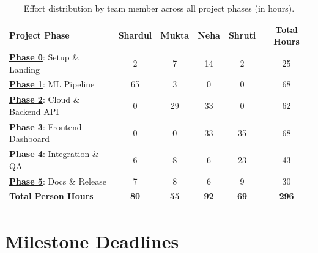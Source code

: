 \documentclass[11pt, a4paper]{article}
\newcommand{\goref}[2]{\hyperref[#1]{\textcolor{primary}{\textbf{#2}}}}
\begin{document}
\begin{table}[h!]
\centering
\small
\renewcommand{\arraystretch}{1.3}
\begin{tabularx}{\textwidth}{|X|c|c|c|c|c|}
\hline
\rowcolor{primary!10}
\textbf{Project Phase} & \textbf{Shardul} & \textbf{Mukta} & \textbf{Neha} & \textbf{Shruti} & \textbf{Total Hours} \\
\hline
\goref{sec:phase0}{Phase 0}: Setup \& Landing & 2 & 7 & 14 & 2 & 25 \\
\hline
\goref{sec:phase1}{Phase 1}: ML Pipeline & 65 & 3 & 0 & 0 & 68 \\
\hline
\goref{sec:phase2}{Phase 2}: Cloud \& Backend API & 0 & 29 & 33 & 0 & 62 \\
\hline
\goref{sec:phase3}{Phase 3}: Frontend Dashboard & 0 & 0 & 33 & 35 & 68 \\
\hline
\goref{sec:phase4}{Phase 4}: Integration \& QA & 6 & 8 & 6 & 23 & 43 \\
\hline
\goref{sec:phase5}{Phase 5}: Docs \& Release & 7 & 8 & 6 & 9 & 30 \\
\hline
\rowcolor{lightgray}
\textbf{Total Person Hours} & \textbf{80} & \textbf{55} & \textbf{92} & \textbf{69} & \textbf{296} \\
\hline
\end{tabularx}
\caption{Effort distribution by team member across all project phases (in hours).}
\end{table}

\section{Milestone Deadlines}
\label{sec:milestones}
\end{document}

